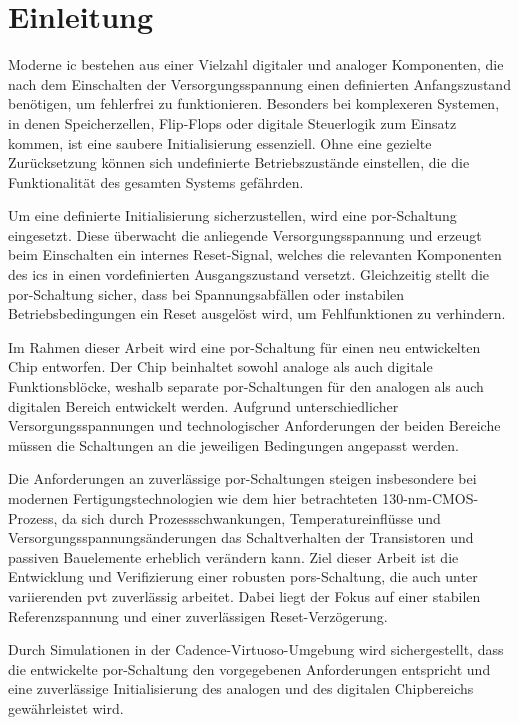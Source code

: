 \chapter{Einleitung}\label{chap:Einleitung}
Moderne \gls{ic} bestehen aus einer Vielzahl digitaler und analoger Komponenten, die nach dem Einschalten der Versorgungsspannung einen definierten Anfangszustand benötigen, um fehlerfrei zu funktionieren. Besonders bei komplexeren Systemen, in denen Speicherzellen, Flip-Flops oder digitale Steuerlogik zum Einsatz kommen, ist eine saubere Initialisierung essenziell. Ohne eine gezielte Zurücksetzung können sich undefinierte Betriebszustände einstellen, die die Funktionalität des gesamten Systems gefährden.

Um eine definierte Initialisierung sicherzustellen, wird eine \gls{por}-Schaltung eingesetzt. Diese überwacht die anliegende Versorgungsspannung und erzeugt beim Einschalten ein internes Reset-Signal, welches die relevanten Komponenten des \glspl{ic} in einen vordefinierten Ausgangszustand versetzt. Gleichzeitig stellt die \gls{por}-Schaltung sicher, dass bei Spannungsabfällen oder instabilen Betriebsbedingungen ein Reset ausgelöst wird, um Fehlfunktionen zu verhindern.

Im Rahmen dieser Arbeit wird eine \gls{por}-Schaltung für einen neu entwickelten Chip entworfen. Der Chip beinhaltet sowohl analoge als auch digitale Funktionsblöcke, weshalb separate \gls{por}-Schaltungen für den analogen als auch digitalen Bereich entwickelt werden. Aufgrund unterschiedlicher Versorgungsspannungen und technologischer Anforderungen der beiden Bereiche müssen die Schaltungen an die jeweiligen Bedingungen angepasst werden.

Die Anforderungen an zuverlässige \gls{por}-Schaltungen steigen insbesondere bei modernen Fertigungstechnologien wie dem hier betrachteten 130-nm-CMOS-Prozess, da sich durch Prozessschwankungen, Temperatureinflüsse und Versorgungsspannungsänderungen das Schaltverhalten der Transistoren und passiven Bauelemente erheblich verändern kann. Ziel dieser Arbeit ist die Entwicklung und Verifizierung einer robusten \glspl{por}-Schaltung, die auch unter variierenden \gls{pvt} zuverlässig arbeitet. Dabei liegt der Fokus auf einer stabilen Referenzspannung und einer zuverlässigen Reset-Verzögerung.

Durch Simulationen in der Cadence-Virtuoso-Umgebung wird sichergestellt, dass die entwickelte \gls{por}-Schaltung den vorgegebenen Anforderungen entspricht und eine zuverlässige Initialisierung des analogen und des digitalen Chipbereichs gewährleistet wird.
